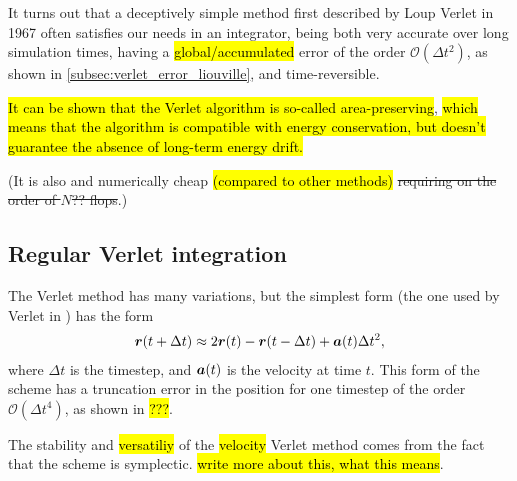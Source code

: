 It turns out that a deceptively simple method first described by Loup Verlet in 1967\cite{verlet1967computer} often satisfies our needs in an integrator, being both very accurate over long simulation times, having a \hl{global/accumulated} error of the order $\mathcal{O}(\Delta t^2)$, as shown in \cref{subsec:verlet_error_liouville}, and time-reversible. 

\hl{It can be shown that the Verlet algorithm is so-called area-preserving}\cite[section 4.3.3]{frenkel2001understanding}, \hl{which means that the algorithm is compatible with energy conservation, but doesn't guarantee the absence of long-term energy drift.}

(It is also and numerically cheap \hl{(compared to other methods)} \st{requiring on the order of $N$?? flops}.)


\subsection{Regular Verlet integration}
The Verlet method has many variations, but the simplest form (the one used by Verlet in \cite{verlet1967computer}) has the form
\begin{align}
    \boldsymbol{r}(t + \Delta t) \approx 2\boldsymbol{r}(t) - \boldsymbol{r}(t - \Delta t) + \boldsymbol{a}(t)\Delta t^2,
    \label{eq:regular_verlet}
\end{align}
where $\Delta t$ is the timestep, and $\boldsymbol{a}(t)$ is the velocity at time $t$. This form of the scheme has a truncation error in the position for one timestep of the order $\mathcal{O}(\Delta t^4)$, as shown in \hl{???}.

The stability and \hl{versatiliy} of the \hl{velocity} Verlet method comes from the fact that the scheme is symplectic. \hl{write more about this, what this means}.

